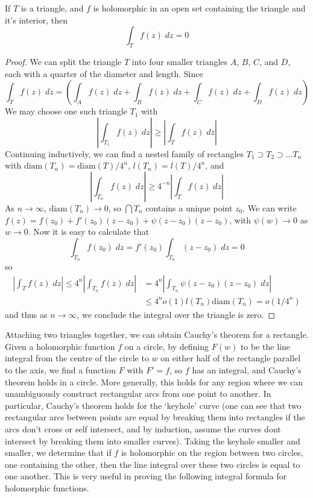 \begin{theorem}
    If $T$ is a triangle, and $f$ is holomorphic in an open set containing the triangle and it's interior, then
    \[ \int_T f(z)\; dz = 0 \]
\end{theorem}
\begin{proof}
    We can split the triangle $T$ into four smaller triangles $A$, $B$, $C$, and $D$, each with a quarter of the diameter and length. Since
    \[ \int_T f(z)\; dz = \left( \int_{A} f(z)\; dz + \int_B f(z)\; dz + \int_C f(z)\; dz + \int_D f(z)\; dz \right) \]
    We may choose one such triangle $T_1$ with
    \[ \left| \int_{T_1} f(z)\; dz \right| \geq \left| \int_T f(z)\; dz \right| \]
    Continuing inductively, we can find a nested family of rectangles $T_1 \supset T_2 \supset \dots T_n$ with $\text{diam}(T_n) = \text{diam}(T)/4^n$, $l(T_n) = l(T)/4^n$, and
    \[ \left| \int_{T_n} f(z)\; dz \right| \geq 4^{-n} \left| \int_T f(z)\; dz \right| \]
    As $n \to \infty$, $\text{diam}(T_n) \to 0$, so $\bigcap T_n$ contains a unique point $z_0$. We can write $f(z) = f(z_0) + f'(z_0) (z - z_0) + \psi(z - z_0)(z - z_0)$, with $\psi(w) \to 0$ as $w \to 0$. Now it is easy to calculate that
    \[ \int_{T_n} f(z_0)\; dz = f'(z_0) \int_{T_n} (z - z_0)\; dz = 0 \]
    so
    \begin{align*}
        \left| \int_T f(z)\; dz \right| \leq 4^n \left| \int_{T_n} f(z)\; dz \right| &= 4^n \left| \int_{T_n} \psi(z-z_0)(z - z_0)\; dz \right|\\
        &\leq 4^n o(1) l(T_n) \text{diam}(T_n) = o(1/4^n)
    \end{align*}
    and thus as $n \to \infty$, we conclude the integral over the triangle is zero.
\end{proof}


Attaching two triangles together, we can obtain Cauchy's theorem for a rectangle. Given a holomorphic function $f$ on a circle, by defining $F(w)$ to be the line integral from the centre of the circle to $w$ on either half of the rectangle parallel to the axis, we find a function $F$ with $F' = f$, so $f$ has an integral, and Cauchy's theorem holds in a circle. More generally, this holds for any region where we can unambiguously construct rectangular arcs from one point to another. In particular, Cauchy's theorem holds for the `keyhole' curve (one can see that two rectangular arcs between points are equal by breaking them into rectangles if the arcs don't cross or self intersect, and by induction, assume the curves dont intersect by breaking them into smaller curves). Taking the keyhole smaller and smaller, we determine that if $f$ is holomorphic on the region between two circles, one containing the other, then the line integral over these two circles is equal to one another. This is very useful in proving the following integral formula for holomorphic functions.

